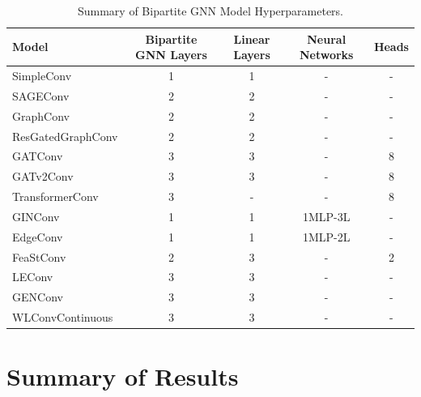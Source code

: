 \documentclass[bst/sn-nature]{sn-jnl}
\begin{document}
\begin{appendices}
\begin{table}[htbp]
    \centering
    \begin{tabular}{|l|c|c|c|c|} %
    \hline
    \textbf{Model} & \textbf{Bipartite GNN Layers} & \textbf{Linear Layers} & \textbf{Neural Networks} & \textbf{Heads} \\ %
    \hline
    \rowcolor[gray]{0.9} SimpleConv & 1 & 1 & - & - \\
    SAGEConv & 2 & 2 & - & - \\
    \rowcolor[gray]{0.9} GraphConv & 2 & 2 & - & - \\
    ResGatedGraphConv & 2 & 2 & - & - \\
    \rowcolor[gray]{0.9} GATConv & 3 & 3 & - & 8 \\
    GATv2Conv & 3 & 3 & - & 8 \\
    \rowcolor[gray]{0.9} TransformerConv & 3 & - & - & 8 \\
    GINConv & 1 & 1 & 1MLP-3L & - \\
    \rowcolor[gray]{0.9} EdgeConv & 1 & 1 & 1MLP-2L & - \\
    FeaStConv & 2 & 3 & - & 2 \\
    \rowcolor[gray]{0.9} LEConv & 3 & 3 & - & - \\
    GENConv & 3 & 3 & - & - \\
    \rowcolor[gray]{0.9} WLConvContinuous & 3 & 3 & - & - \\
    \hline
    \end{tabular}
    \caption{Summary of Bipartite GNN Model Hyperparameters.}
    \label{tab:hyperparameters}
\end{table}

\clearpage

\section{Summary of Results}\label{secA3}

\vspace{1cm}


\end{appendices}
\end{document}
